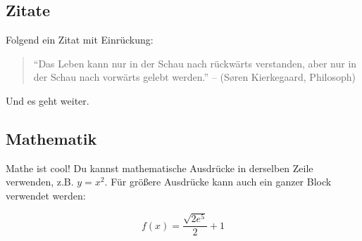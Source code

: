 \subsection{Zitate}

Folgend ein Zitat mit Einrückung:

\begin{quote}
\enquote{Das Leben kann nur in der Schau nach rückwärts verstanden, aber nur in der Schau nach vorwärts gelebt werden.} -- (Søren Kierkegaard, Philosoph)
\end{quote}

Und es geht weiter.

\subsection{Mathematik}

Mathe ist cool! Du kannst mathematische Ausdrücke in derselben Zeile verwenden, z.B. $y=x^2$. Für größere Ausdrücke kann auch ein ganzer Block verwendet werden:

\[ f(x) = \frac{\sqrt{2e^5}}{2} + 1\]